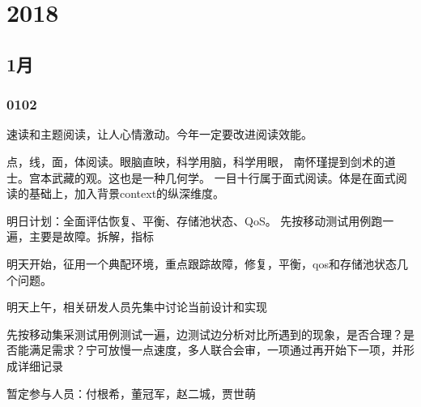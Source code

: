 \chapter{2018}

\section{1月}

\subsection{0102}

速读和主题阅读，让人心情激动。今年一定要改进阅读效能。

点，线，面，体阅读。眼脑直映，科学用脑，科学用眼，
南怀瑾提到剑术的道士。宫本武藏的观。这也是一种几何学。
一目十行属于面式阅读。体是在面式阅读的基础上，加入背景context的纵深维度。

明日计划：全面评估恢复、平衡、存储池状态、QoS。
先按移动测试用例跑一遍，主要是故障。拆解，指标

明天开始，征用一个典配环境，重点跟踪故障，修复，平衡，qos和存储池状态几个问题。

\begin{compactenum}
\item 明天上午，相关研发人员先集中讨论当前设计和实现
\item 先按移动集采测试用例测试一遍，边测试边分析对比所遇到的现象，是否合理？是否能满足需求？宁可放慢一点速度，多人联合会审，一项通过再开始下一项，并形成详细记录
\end{compactenum}

暂定参与人员：付根希，董冠军，赵二城，贾世萌
